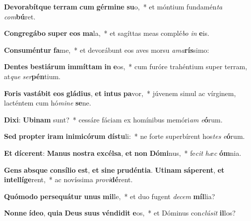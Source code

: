 \item \textbf{De}\textbf{vo}\textbf{ra}\textbf{bít}\textbf{que} \textbf{ter}\textbf{ram} \textbf{cum} \textbf{gér}\textbf{mi}\textbf{ne} \textbf{su}o,~* et móntium fundamén\textit{ta} \textit{com}\textbf{bú}ret.
\item \textbf{Con}\textbf{gre}\textbf{gá}\textbf{bo} \textbf{su}\textbf{per} \textbf{e}\textbf{os} \textbf{ma}la,~* et sagíttas meas complé\textit{bo} \textit{in} \textbf{e}is.
\item \textbf{Con}\textbf{su}\textbf{mén}\textbf{tur} \textbf{fa}me,~* et devorábunt eos aves morsu \textit{a}\textit{ma}\textbf{rís}simo:
\item \textbf{Den}\textbf{tes} \textbf{bes}\textbf{ti}\textbf{á}\textbf{rum} \textbf{im}\textbf{mít}\textbf{tam} \textbf{in} \textbf{e}os,~* cum furóre trahéntium super terram, at\textit{que} \textit{ser}\textbf{pén}tium.
\item \textbf{Fo}\textbf{ris} \textbf{vas}\textbf{tá}\textbf{bit} \textbf{e}\textbf{os} \textbf{glá}\textbf{di}\textbf{us}, \textbf{et} \textbf{in}\textbf{tus} \textbf{pa}vor,~* júvenem simul ac vírginem, lacténtem cum hó\textit{mi}\textit{ne} \textbf{se}ne.
\item \textbf{Di}\textbf{xi}: \textbf{U}\textbf{bi}\textbf{nam} sunt?~* cessáre fáciam ex homínibus memóri\textit{am} \textit{e}\textbf{ó}rum.
\item \textbf{Sed} \textbf{prop}\textbf{ter} \textbf{i}\textbf{ram} \textbf{in}\textbf{i}\textbf{mi}\textbf{có}\textbf{rum} \textbf{dís}\textbf{tu}li:~* ne forte superbírent hos\textit{tes} \textit{e}\textbf{ó}rum.
\item \textbf{Et} \textbf{dí}\textbf{ce}\textbf{rent}: \textbf{Ma}\textbf{nus} \textbf{nos}\textbf{tra} \textbf{ex}\textbf{cél}\textbf{sa}, \textbf{et} \textbf{non} \textbf{Dó}\textbf{mi}nus,~* fe\textit{cit} \textit{hæc} \textbf{óm}nia.
\item \textbf{Gens} \textbf{abs}\textbf{que} \textbf{con}\textbf{sí}\textbf{li}\textbf{o} \textbf{est}, \textbf{et} \textbf{si}\textbf{ne} \textbf{pru}\textbf{dén}\textbf{ti}\textbf{a}. \textbf{U}\textbf{ti}\textbf{nam} \textbf{sá}\textbf{pe}\textbf{rent}, \textbf{et} \textbf{in}\textbf{tel}\textbf{lí}\textbf{ge}rent,~* ac novíssima \textit{pro}\textit{vi}\textbf{dé}rent.
\item \textbf{Quó}\textbf{mo}\textbf{do} \textbf{per}\textbf{se}\textbf{quá}\textbf{tur} \textbf{u}\textbf{nus} \textbf{mil}le,~* et duo fugent \textit{de}\textit{cem} \textbf{míl}lia?
\item \textbf{Non}\textbf{ne} \textbf{íd}\textbf{e}\textbf{o}, \textbf{qui}\textbf{a} \textbf{De}\textbf{us} \textbf{su}\textbf{us} \textbf{vén}\textbf{di}\textbf{dit} \textbf{e}os,~* et Dóminus con\textit{clú}\textit{sit} \textbf{il}los?
